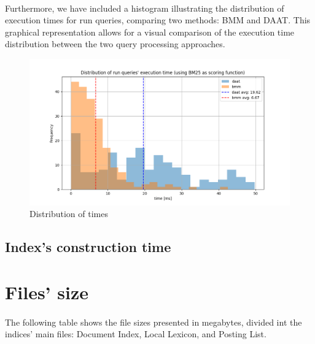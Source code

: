 \paragraph{}
Furthermore, we have included a histogram illustrating the distribution of execution times for run queries, comparing two methods: BMM and DAAT. This graphical representation allows for a visual comparison of the execution time distribution between the two query processing approaches.

\begin{figure}[H]
	\centering
	\includegraphics[width=1\textwidth]{assets/times_distrib.png}
	\caption{Distribution of times}
	\label{fig:time_distribution}
\end{figure}
	
\subsection{Index's construction time}

	
\section{Files' size}

\paragraph{}
The following table shows the file sizes presented in megabytes, divided int the indices' main files: Document Index, Local Lexicon, and Posting List.

